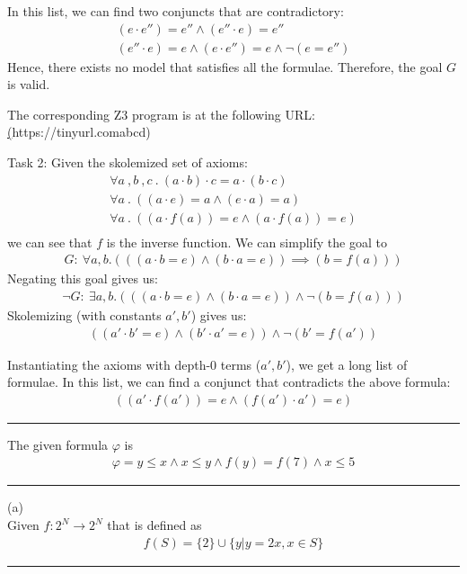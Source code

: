 \documentclass[12pt,letterpaper, onecolumn]{exam}
\newcommand{\link}[1]{{\color{blue}\href{#1}{#1}}}
\begin{document}
\begin{questions}
	In this list,
	we can find two conjuncts that are contradictory:
	\begin{align*}
		(e \cdot e'') = e'' \land (e'' \cdot e) = e'' \\
		(e'' \cdot e) = e \land (e \cdot e'') = e \land \neg (e = e'')
	\end{align*}
	Hence, there exists no model that satisfies all the formulae.
	Therefore, the goal $G$ is valid.

	The corresponding Z3 program is at the following URL:
	\link(https://tinyurl.comabcd)
	

	Task 2:
	Given the skolemized set of axioms:
	\begin{align*}
		\forall a \:, b \:, c \:.\: (a \cdot b) \cdot c = a \cdot (b \cdot c) \\
		\forall a \:.\: ((a \cdot e) = a \land (e \cdot a) = a) \\
		\forall a \:.\: ((a \cdot f(a)) = e \land (a \cdot f(a)) = e) \\
	\end{align*}
	we can see that $f$ is the inverse function. We can simplify the goal to 
	\begin{align*}
		G : \: \forall a, b . (((a \cdot b = e) \land (b \cdot a = e)) \implies (b = f(a)) )
	\end{align*}
	Negating this goal gives us:
	\begin{align*}
		\neg G : \: \exists a, b . (((a \cdot b = e) \land (b \cdot a = e)) \land \neg(b = f(a)))
	\end{align*}
	Skolemizing (with constants $a', b'$) gives us:
	\begin{align*}
		((a' \cdot b' = e) \land (b' \cdot a' = e)) \land \neg(b' = f(a'))
	\end{align*}

	Instantiating the axioms with depth-0 terms ($a', b'$), we get a long list of formulae. In this list,
	we can find a conjunct that contradicts the above formula:
	\begin{align*}
		((a' \cdot f(a')) = e \land (f(a') \cdot a') = e)
	\end{align*}



	

    {\rule{17cm}{0.4pt}}

	\question[]
	\solutiontitle

	The given formula $ \varphi $ is
	\begin{align*}
		\varphi = y \le x \land x \le y \land f(y) = f(7) \land x \le 5
	\end{align*}


    {\rule{17cm}{0.4pt}}

	\question[]
	\solutiontitle

	(a) \\
	Given $ f: 2^{N} \rightarrow 2^{N} $ that is defined as 
	\begin{align*}
		f(S) = \{2\} \cup \{y | y = 2x, x \in S\}
	\end{align*}


    {\rule{17cm}{0.4pt}}

\end{questions}
\end{document}
